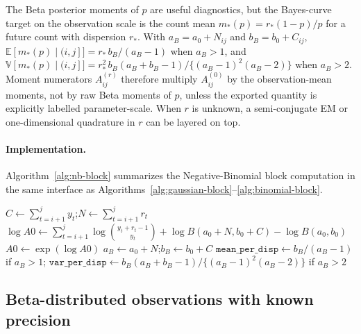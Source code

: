 \begin{remark}
\label{rem:negbin-obs-scale}
The Beta posterior moments of $p$ are useful diagnostics, but the Bayes-curve target on the
observation scale is the count mean $m_*(p)=r_*(1-p)/p$ for a future count with dispersion $r_*$.
With $a_B=a_0+N_{ij}$ and $b_B=b_0+C_{ij}$,
\(\mathbb{E}[m_*(p)\mid(i,j]] = r_*\,b_B/(a_B-1)\) when $a_B>1$, and
\(\mathbb{V}[m_*(p)\mid(i,j]] = r_*^2\,b_B(a_B+b_B-1)/\{(a_B-1)^2(a_B-2)\}\) when $a_B>2$.
Moment numerators $A^{(r)}_{ij}$ therefore multiply $A^{(0)}_{ij}$ by the observation-mean
moments, not by raw Beta moments of $p$, unless the exported quantity is explicitly labelled
parameter-scale. When $r$ is unknown, a semi-conjugate EM or one-dimensional quadrature in $r$
can be layered on top.
\end{remark}

\paragraph{Implementation.}
Algorithm~\ref{alg:nb-block} summarizes the Negative-Binomial block computation in the same
interface as Algorithms~\ref{alg:gaussian-block}--\ref{alg:binomial-block}.

\begin{algorithm}[H]
\caption{NegBinBlock$(y,r,i,j,a_0,b_0)$}
\label{alg:nb-block}
\KwIn{Block $(i,j]$; counts $y_{i+1:j}$; dispersion $r$ (possibly per-$t$)}
$C\leftarrow\sum_{t=i+1}^j y_t$;\quad $N\leftarrow\sum_{t=i+1}^j r_t$\;
$\log A0\leftarrow \sum_{t=i+1}^j \log\binom{y_t+r_t-1}{y_t} + \log B(a_0+N, b_0+C) - \log B(a_0,b_0)$\;
$A0\leftarrow\exp(\log A0)$\;
$a_B\leftarrow a_0+N$;\quad $b_B\leftarrow b_0+C$\;
$\texttt{mean\_per\_disp}\leftarrow b_B/(a_B-1)$ if $a_B>1$;\quad
$\texttt{var\_per\_disp}\leftarrow b_B(a_B+b_B-1)/\{(a_B-1)^2(a_B-2)\}$ if $a_B>2$\;
\end{algorithm}

\subsection{Beta-distributed observations with known precision}
\label{sec:family-beta}

